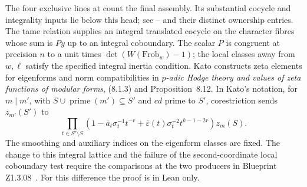 The four exclusive lines at  count the final assembly. Its substantial cocycle and integrality inputs lie below this head; see -- and their distinct ownership entries. The tame relation supplies an integral translated cocycle on the
character fibres whose sum is \(P y\) up to an integral coboundary.
The scalar \(P\) is congruent at precision \(n\) to a unit times
\(\det(W(\mathrm{Frob}_w)-1)\); the local classes away from \(w,\ell\)
satisfy the specified integral inertia condition. Kato constructs zeta
elements for eigenforms and norm compatibilities in \emph{\(p\)-adic
Hodge theory and values of zeta functions of modular forms}, (8.1.3)
and Proposition~8.12. In Kato's notation, for \(m\mid m'\), with
\(S\cup\operatorname{prime}(m')\subseteq S'\) and \(cd\) prime to \(S'\),
corestriction sends \(z_{m'}(S')\) to
\[
 \prod_{t\in S'\setminus S}
 \left(1-\overline a_t\sigma_t^{-1}t^{-r}
 +\overline{\varepsilon}(t)\sigma_t^{-2}t^{k-1-2r}\right)z_m(S).
\]
The smoothing and auxiliary indices on the eigenform classes are fixed.
The change to this integral lattice and the failure
of the second-coordinate local coboundary test require the comparisons
at the two producers in Blueprint Z1.3.08~. For this difference the proof
is in Lean only. \cite{r21-kato}
